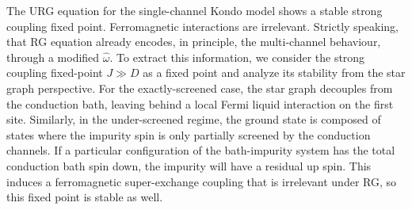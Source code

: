 \documentclass[reprint,prb,superscriptaddress]{revtex4-2}
\begin{document}
The URG equation for the single-channel Kondo model \cite{kondo_urg} shows a stable strong coupling fixed point. Ferromagnetic interactions are irrelevant. Strictly speaking, that RG equation already encodes, in principle, the multi-channel behaviour, through a modified \(\hat \omega\). To extract this information, we consider the strong coupling fixed-point \(J \gg D\) as a fixed point and analyze its stability from the star graph perspective. For the exactly-screened case, the star graph decouples from the conduction bath, leaving behind a local Fermi liquid interaction on the first site. Similarly, in the under-screened regime, the ground state is composed of states where the impurity spin is only partially screened by the conduction channels. If a particular configuration of the bath-impurity system has the total conduction bath spin down, the impurity will have a residual up spin. This induces a ferromagnetic super-exchange coupling that is irrelevant under RG, so this fixed point is stable as well. 
\end{document}
